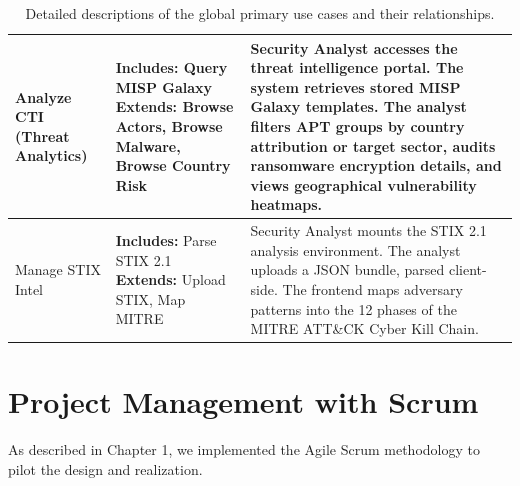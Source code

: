 \begin{table}[H]
\begin{tabularx}{\textwidth}{>{\raggedright\arraybackslash}p{3.2cm}>{\raggedright\arraybackslash}p{3.5cm}X}
\midrule
Analyze CTI \newline (Threat Analytics) &
\textbf{Includes:} Query MISP Galaxy \newline
\textbf{Extends:} Browse Actors, Browse Malware, Browse Country Risk &
Security Analyst accesses the threat intelligence portal. The system retrieves stored MISP Galaxy templates. The analyst filters APT groups by country attribution or target sector, audits ransomware encryption details, and views geographical vulnerability heatmaps. \\
\midrule
Manage STIX Intel &
\textbf{Includes:} Parse STIX 2.1 \newline
\textbf{Extends:} Upload STIX, Map MITRE &
Security Analyst mounts the STIX 2.1 analysis environment. The analyst uploads a JSON bundle, parsed client-side. The frontend maps adversary patterns into the 12 phases of the MITRE ATT\&CK Cyber Kill Chain. \\
\hline
\end{tabularx}
\caption{Detailed descriptions of the global primary use cases and their relationships.}
\label{tab:global_uc_desc}
\end{table}

\clearpage

\section{Project Management with Scrum}
As described in Chapter 1, we implemented the Agile Scrum methodology to pilot the design and realization.

